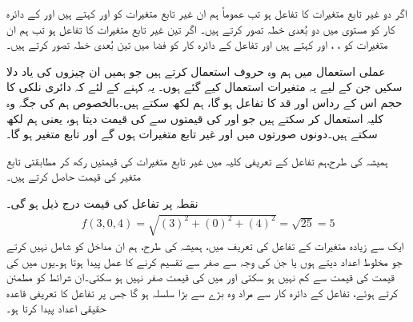اگر  دو غیر تابع متغیرات کا تفاعل ہو تب عموماً ہم  ان غیر تابع متغیرات کو  اور  کہتے ہیں اور  کے دائرہ کار  کو مستوی  میں  دو بُعدی  خطہ تصور کرتے ہیں۔ اگر  تین غیر تابع متغیرات کا تفاعل ہو تب ہم  ان متغیرات کو ، ،  اور  کہتے ہیں اور تفاعل کے  دائرہ کار کو فضا میں تین بُعدی خطہ تصور کرتے ہیں۔

عملی استعمال میں ہم  وہ حروف استعمال کرتے ہیں جو ہمیں ان چیزوں  کی یاد  دلا سکیں جن کے لیے یہ متغیرات استعمال  کیے گئے ہوں۔ یہ  کہنے  کے لئے  کہ دائری نلکی کا حجم اس کے رداس   اور قد    کا تفاعل ہو گا، ہم  لکھ سکتے ہیں۔بالخصوص  ہم  کی جگہ وہ کلیہ استعمال کر سکتے ہیں جو  اور  کی قیمتوں سے  کی  قیمت دیتا ہو، یعنی ہم   لکھ سکتے ہیں۔دونوں صورتوں میں  اور  غیر تابع متغیرات ہوں گے اور  تابع متغیر ہو گا۔

ہمیشہ کی طرح،ہم  تفاعل کے تعریفی کلیہ میں غیر تابع متغیرات کی قیمتیں  رکھ کر  مطابقتی تابع متغیر کی قیمت حاصل کرتے ہیں۔

نقطہ  پر تفاعل  کی قیمت درج ذیل ہو گی۔
\begin{align*}
f(3,0,4)=\sqrt{(3)^2+(0)^2+(4)^2}=\sqrt{25}=5
\end{align*}
ایک سے زیادہ متغیرات کے تفاعل  کی تعریف  میں، ہمیشہ کی طرح، ہم  ان مداخل کو  شامل نہیں  کرتے   جو مخلوط اعداد دیتے ہوں یا جن کی وجہ سے صفر سے    تقسیم  کرنے کا عمل  پیدا ہوتا ہو۔یوں  میں  کی قیمت  کی قیمت سے کم نہیں ہو سکتی  اور  میں  کی قیمت صفر نہیں ہو سکتی۔ان شرائط کو مطمئن کرتے ہوئے، تفاعل کے  دائرہ کار سے مراد  وہ بڑے سے بڑا سلسلہ ہو گا جس پر تفاعل کا  تعریفی قاعدہ حقیقی اعداد  پیدا کرتا ہو۔ 

